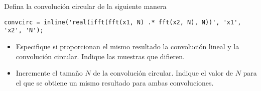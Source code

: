 \documentclass{article}
\begin{document}
Defina la convolución circular de la siguiente manera
\begin{lstlisting}
convcirc = inline('real(ifft(fft(x1, N) .* fft(x2, N), N))', 'x1', 'x2', 'N');
\end{lstlisting}
\begin{itemize}
\item Especifique si proporcionan el mismo resultado la convolución lineal y la convolución circular. Indique las muestras que difieren.
\item Incremente el tamaño $N$ de la convolución circular. Indique el valor de $N$ para el que se obtiene un mismo resultado para ambas convoluciones.
\end{itemize}
\end{document}
